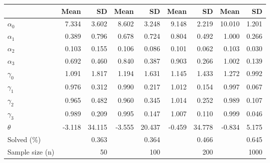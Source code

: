
\begin{tabular}[t]{lrrrrrrrr}
\toprule
  & Mean & SD & Mean  & SD  & Mean   & SD   & Mean    & SD   \\
\midrule
$\alpha_{0}$ & 7.334 & 3.602 & 8.602 & 3.248 & 9.148 & 2.219 & 10.010 & 1.201\\
$\alpha_{1}$ & 0.389 & 0.796 & 0.678 & 0.724 & 0.804 & 0.492 & 1.000 & 0.266\\
$\alpha_{2}$ & 0.103 & 0.155 & 0.106 & 0.086 & 0.101 & 0.062 & 0.103 & 0.030\\
$\alpha_{3}$ & 0.692 & 0.460 & 0.840 & 0.387 & 0.903 & 0.266 & 1.002 & 0.139\\
$\gamma_{0}$ & 1.091 & 1.817 & 1.194 & 1.631 & 1.145 & 1.433 & 1.272 & 0.992\\
$\gamma_{1}$ & 0.976 & 0.312 & 0.990 & 0.217 & 1.012 & 0.154 & 0.997 & 0.067\\
$\gamma_{2}$ & 0.965 & 0.482 & 0.960 & 0.345 & 1.014 & 0.252 & 0.989 & 0.107\\
$\gamma_{3}$ & 0.989 & 0.209 & 0.995 & 0.147 & 1.007 & 0.110 & 0.999 & 0.046\\
$\theta$ & -3.118 & 34.115 & -3.555 & 20.437 & -0.459 & 34.778 & -0.834 & 5.175\\
Solved (\%) &  & 0.363 &  & 0.364 &  & 0.466 &  & 0.645\\
Sample size (n) &  & 50 &  & 100 &  & 200 &  & 1000\\
\bottomrule
\end{tabular}
